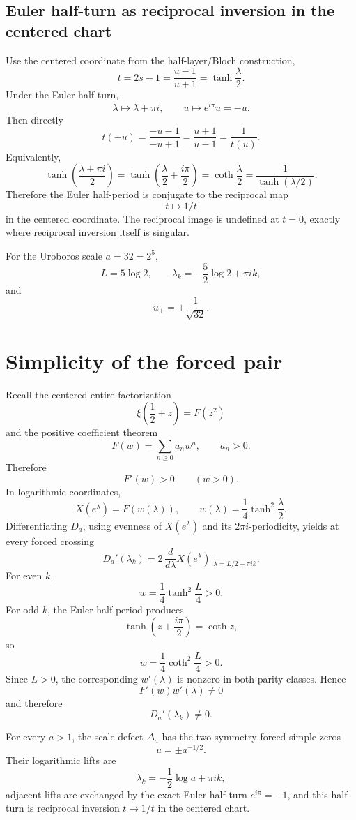 \subsection{Euler half-turn as reciprocal inversion in the centered chart}

Use the centered coordinate from the half-layer/Bloch construction,
\[
t=2s-1=\frac{u-1}{u+1}=\tanh\frac\lambda2.
\]
Under the Euler half-turn,
\[
\lambda\mapsto\lambda+\pi i,
\qquad
u\mapsto e^{i\pi}u=-u.
\]
Then directly
\[
t(-u)
=\frac{-u-1}{-u+1}
=\frac{u+1}{u-1}
=\boxed{\frac1{t(u)}}.
\]
Equivalently,
\[
\tanh\!\left(\frac{\lambda+\pi i}{2}\right)
=\tanh\!\left(\frac\lambda2+\frac{i\pi}{2}\right)
=\coth\frac\lambda2
=\boxed{\frac1{\tanh(\lambda/2)}}.
\]
Therefore the Euler half-period is conjugate to the reciprocal map
\[
\boxed{t\mapsto1/t}
\]
in the centered coordinate. The reciprocal image is undefined at \(t=0\), exactly where reciprocal inversion itself is singular.

For the Uroboros scale \(a=32=2^5\),
\[
L=5\log2,
\qquad
\boxed{\lambda_k=-\frac52\log2+\pi i k},
\]
and
\[
\boxed{u_\pm=\pm\frac1{\sqrt{32}}}.
\]

\section{Simplicity of the forced pair}

Recall the centered entire factorization
\[
\xi\!\left(\frac12+z\right)=F(z^2)
\]
and the positive coefficient theorem
\[
F(w)=\sum_{n\ge0}a_nw^n,\qquad a_n>0.
\]
Therefore
\[
F'(w)>0\qquad(w>0).
\]
In logarithmic coordinates,
\[
X(e^\lambda)
=F\!\left(w(\lambda)\right),
\qquad
w(\lambda)=\frac14\tanh^2\frac\lambda2.
\]
Differentiating \(D_a\), using evenness of \(X(e^\lambda)\) and its \(2\pi i\)-periodicity, yields at every forced crossing
\[
D_a'(\lambda_k)
=2\,\frac{d}{d\lambda}X(e^\lambda)
\Big|_{\lambda=L/2+\pi i k}.
\]
For even \(k\),
\[
w=\frac14\tanh^2\frac{L}{4}>0.
\]
For odd \(k\), the Euler half-period produces
\[
\tanh\!\left(z+\frac{i\pi}{2}\right)=\coth z,
\]
so
\[
w=\frac14\coth^2\frac{L}{4}>0.
\]
Since \(L>0\), the corresponding \(w'(\lambda)\) is nonzero in both parity classes. Hence
\[
F'(w)w'(\lambda)\neq0
\]
and therefore
\[
\boxed{D_a'(\lambda_k)\neq0}.
\]

\begin{theorem}
For every \(a>1\), the scale defect \(\Delta_a\) has the two symmetry-forced simple zeros
\[
\boxed{u=\pm a^{-1/2}}.
\]
Their logarithmic lifts are
\[
\boxed{\lambda_k=-\frac12\log a+\pi i k},
\]
adjacent lifts are exchanged by the exact Euler half-turn \(e^{i\pi}=-1\), and this half-turn is reciprocal inversion \(t\mapsto1/t\) in the centered chart.
\end{theorem}

